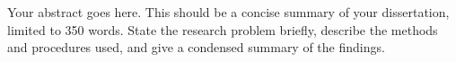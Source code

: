 \begin{dissertationabstract}


Your abstract goes here. This should be a concise summary of your dissertation, limited to 350 words. State the research problem briefly, describe the methods and procedures used, and give a condensed summary of the findings.

\end{dissertationabstract}
